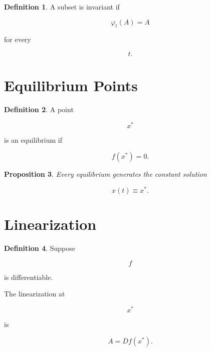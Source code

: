 \documentclass[11pt]{book}
\numberwithin{equation}{chapter}
\theoremstyle{definition}
\newtheorem{definition}{Definition}[chapter]
\theoremstyle{plain}
\newtheorem{proposition}[definition]{Proposition}
\begin{document}

\begin{definition}

A subset is invariant if

\[
\varphi_t(A)
=
A
\]

for every

\[
t.
\]

\end{definition}


\section{Equilibrium Points}

\begin{definition}

A point

\[
x^*
\]

is an equilibrium if

\[
f(x^*)=0.
\]

\end{definition}


\begin{proposition}

Every equilibrium generates the constant solution

\[
x(t)\equiv x^*.
\]

\end{proposition}


\section{Linearization}

\begin{definition}

Suppose

\[
f
\]

is differentiable.

The linearization at

\[
x^*
\]

is

\[
A
=
Df(x^*).
\]

\end{definition}
\end{document}
